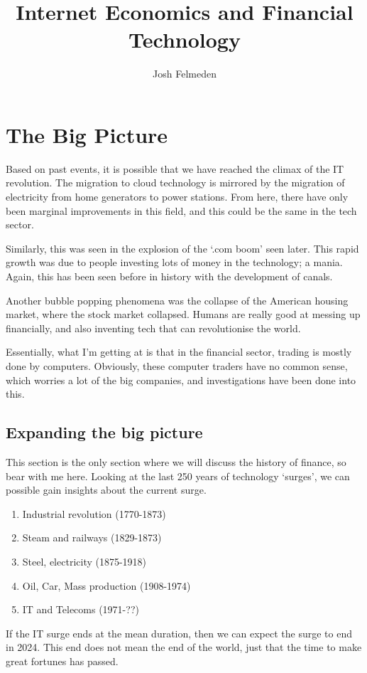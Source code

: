 \documentclass[11pt,a4paper,titlepage,dvipsnames,cmyk]{scrartcl}
\title{Internet Economics and Financial Technology}
\author{Josh Felmeden}
\begin{document}
\maketitle
\tableofcontents
\newpage
\section{The Big Picture}
Based on past events, it is possible that we have reached the climax of the IT revolution. The migration to cloud technology is mirrored by the migration of electricity from home generators to power stations. From here, there have only been marginal improvements in this field, and this could be the same in the tech sector.

Similarly, this was seen in the explosion of the `.com boom' seen later. This rapid growth was due to people investing lots of money in the technology; a mania. Again, this has been seen before in history with the development of canals.

Another bubble popping phenomena was the collapse of the American housing market, where the stock market collapsed. Humans are really good at messing up financially, and also inventing tech that can revolutionise the world.

Essentially, what I'm getting at is that in the financial sector, trading is mostly done by computers. Obviously, these computer traders have no common sense, which worries a lot of the big companies, and investigations have been done into this.

\subsection{Expanding the big picture}
This section is the only section where we will discuss the history of finance, so bear with me here. Looking at the last 250 years of technology `surges', we can possible gain insights about the current surge.

\begin{enumerate}
\item Industrial revolution (1770-1873)
\item Steam and railways (1829-1873)
\item Steel, electricity (1875-1918)
\item Oil, Car, Mass production (1908-1974)
\item IT and Telecoms (1971-??)
\end{enumerate}

If the IT surge ends at the mean duration, then we can expect the surge to end in 2024. This end does not mean the end of the world, just that the time to make great fortunes has passed.
\end{document}
